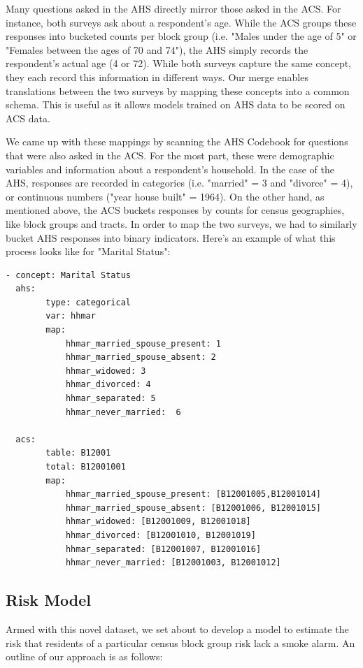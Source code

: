 \documentclass{sig-alternate}
\begin{document}
Many questions asked in the AHS directly mirror those asked in the ACS. For instance, both surveys ask about a respondent's age. While the ACS groups these responses into bucketed counts per block group (i.e. "Males under the age of 5" or "Females between the ages of 70 and 74"), the AHS simply records the respondent's actual age (4 or 72). While both surveys capture the same concept, they each record this information in different ways. Our merge enables translations between the two surveys by mapping these concepts into a common schema. This is useful as it allows models trained on AHS data to be scored on ACS data. 

We came up with these mappings by scanning the AHS Codebook for questions that were also asked in the ACS. For the most part, these were demographic variables and information about a respondent's household. In the case of the AHS, responses are recorded in categories (i.e. "married" = 3 and "divorce" = 4), or continuous numbers ("year house built" = 1964). On the other hand, as mentioned above, the ACS buckets responses by counts for census geographies, like block groups and tracts. In order to map the two surveys, we had to similarly bucket AHS responses into binary indicators. Here's an example of what this process looks like for "Marital Status":
\begin{verbatim}
- concept: Marital Status 
  ahs:
        type: categorical
        var: hhmar 
        map:
            hhmar_married_spouse_present: 1
            hhmar_married_spouse_absent: 2
            hhmar_widowed: 3
            hhmar_divorced: 4
            hhmar_separated: 5
            hhmar_never_married:  6

  acs:
        table: B12001
        total: B12001001
        map:
            hhmar_married_spouse_present: [B12001005,B12001014]
            hhmar_married_spouse_absent: [B12001006, B12001015]
            hhmar_widowed: [B12001009, B12001018]
            hhmar_divorced: [B12001010, B12001019]
            hhmar_separated: [B12001007, B12001016]
            hhmar_never_married: [B12001003, B12001012]
\end{verbatim}

\subsection{Risk Model}

Armed with this novel dataset, we set about to develop a model to estimate the risk that residents of a particular census block group risk lack a smoke alarm.  An outline of our approach is as follows:
\end{document}
